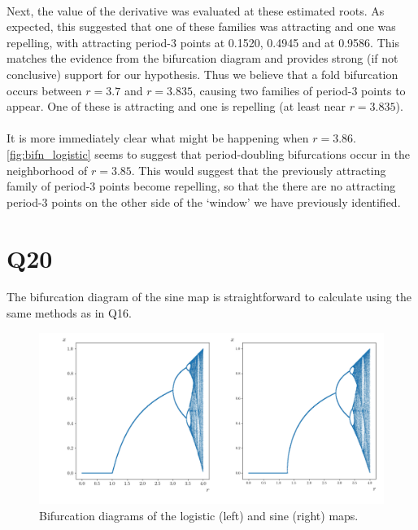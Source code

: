 \documentclass{article}
\begin{document}
\paragraph{}
Next, the value of the derivative was evaluated at these estimated roots. As expected, this 
suggested that one of these families was attracting and one was repelling, with attracting period-3 
points at 0.1520, 0.4945 and at 0.9586. This matches the evidence from the bifurcation diagram 
and provides strong (if not conclusive) support for our hypothesis. Thus we believe that a 
fold bifurcation occurs between $r = 3.7$ and $r = 3.835$, causing two families of 
period-3 points to appear. One of these is attracting and one is repelling (at least near $r = 3.835$). 

\paragraph{}
It is more immediately clear what might be happening when $r = 3.86$. \autoref{fig:bifn_logistic} 
seems to suggest that period-doubling bifurcations occur in the neighborhood of $r = 3.85$. This 
would suggest that the previously attracting family of period-3 points become repelling, so that the 
there are no attracting period-3 points on the other side of the `window' we have previously 
identified.

\section*{Q20}
The bifurcation diagram of the sine map is straightforward to calculate using the same methods 
as in Q16.

\begin{figure}[H]
    \centering
    \hspace{-0.5in}
    \includegraphics[scale = 0.5]{Figure_6.png}
	\caption{Bifurcation diagrams of the logistic (left) and sine (right) maps.}
    \label{fig:bifn_sin}
\end{figure}
\end{document}
